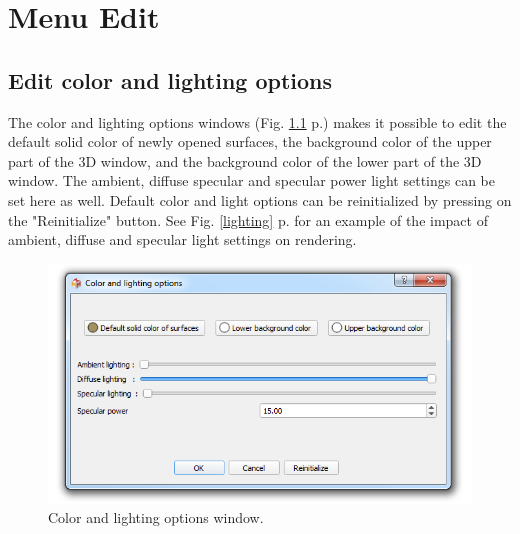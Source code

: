 




\chapter{Menu Edit}
\minitoc  

\section{Edit color and lighting options}

\noindent
The color and lighting options windows (Fig. \ref{color_options} p.\pageref{color_options}) makes it possible to edit the default solid color of newly opened surfaces, the background color of the upper part of the 3D window, and the background color of the lower part of the 3D window. The ambient, diffuse specular and specular power light settings can be set here as well. Default color and light options can be reinitialized by pressing on the "Reinitialize" button. See Fig. \ref{lighting} p.\pageref{lighting} for an example of the impact of ambient, diffuse and specular light settings on rendering.

\begin{figure}
  \centering
  \includegraphics[scale=0.55]{images/08/color_options.png} 
	\caption{Color and lighting options window.}
\label{color_options}
 
\end{figure}

